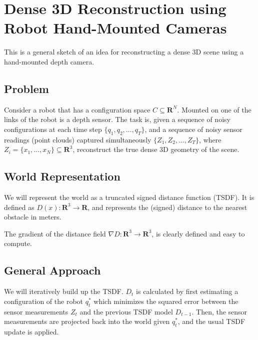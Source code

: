 \documentclass{article}
\begin{document}
\section{Dense 3D Reconstruction using Robot Hand-Mounted Cameras}

This is a general sketch of an idea for reconstructing a dense 3D scene using a
hand-mounted depth camera.

\subsection{Problem}

Consider a robot that has a configuration space $C \subseteq \mathbf{R}^N$.
Mounted on one of the links of the robot is a depth sensor. The task is, given a
sequence of noisy configurations at each time step $\{q_1, q_2, \ldots,
q_T\}$, and a sequence of noisy sensor readings (point clouds) captured
simultaneously $\{Z_1, Z_2, \ldots, Z_T\}$, where $Z_i = \{x_1, \ldots, x_N\} \subseteq
\mathbf{R}^3$, reconstruct the true dense 3D geometry of the scene. 

\subsection{World Representation}

We will represent the world as a truncated signed distance function (TSDF). It
is defined as $D(x) : \mathbf{R}^3 \to \mathbf{R}$, and represents the (signed)
distance to the nearest obstacle in meters.

The gradient of the distance field $\nabla D : \mathbf{R}^3 \to \mathbf{R}^3$,
is clearly defined and easy to compute.

\subsection{General Approach}

We will iteratively build up the TSDF. $D_t$ is calculated by first estimating a
configuration of the robot $q^*_t$ which minimizes the squared error between the
sensor measurements $Z_t$ and the previous TSDF model $D_{t - 1}$. Then, the
sensor measurements are projected back into the world given $q^*_t$, and the
usual TSDF update is applied.
\end{document}
